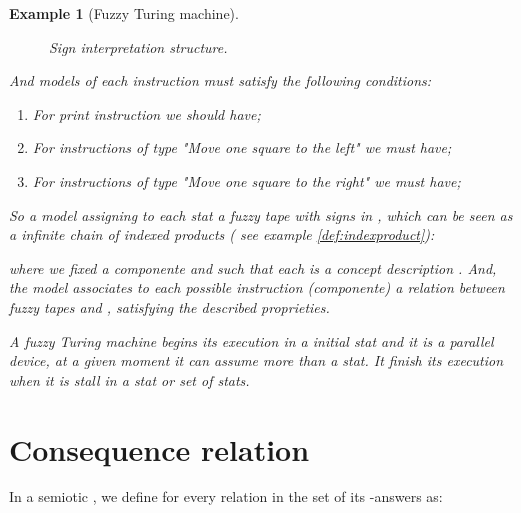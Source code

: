\documentclass[oribibl]{llncs}
\newtheorem{exam}{Example}
\begin{document}
\begin{exam}[Fuzzy Turing machine]
\begin{figure}[h]

\caption{Sign interpretation structure.}\label{struct}
\end{figure}
And models of each instruction must satisfy the following conditions:
\begin{enumerate}
  \item For print instruction  we should have;

  \item For instructions of type "Move one square to the left"   we must have;

  \item For instructions of type "Move one square to the right"   we must have;

\end{enumerate}
So a model  assigning to each stat a \emph{fuzzy tape} with signs in , which can be seen as a infinite chain of indexed products ( see example \ref{def:indexproduct}):

where we fixed a componente  and such that each  is a concept description . And, the model  associates to each possible instruction (componente) a relation between fuzzy tapes  and , satisfying the described proprieties.

A fuzzy Turing machine begins its execution in a initial stat and it is a parallel device, at a given moment it can assume more than a stat. It finish its execution when it is stall in a stat or set of stats.
\end{exam}


\section{Consequence relation}\label{consequence relation}
In a semiotic , we define for every relation  in 
the set of its -answers as:
\end{document}

